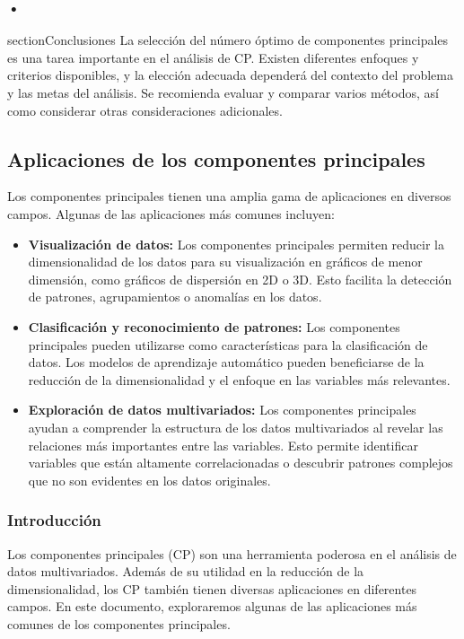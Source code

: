\documentclass{article}
\begin{document}
\subsubsection*{•}section{Conclusiones}
La selección del número óptimo de componentes principales es una tarea importante en el análisis de CP. Existen diferentes enfoques y criterios disponibles, y la elección adecuada dependerá del contexto del problema y las metas del análisis. Se recomienda evaluar y comparar varios métodos, así como considerar otras consideraciones adicionales. 


\subsection{Aplicaciones de los componentes principales}
Los componentes principales tienen una amplia gama de aplicaciones en diversos campos. Algunas de las aplicaciones más comunes incluyen:

\begin{itemize}
    \item \textbf{Visualización de datos:} Los componentes principales permiten reducir la dimensionalidad de los datos para su visualización en gráficos de menor dimensión, como gráficos de dispersión en 2D o 3D. Esto facilita la detección de patrones, agrupamientos o anomalías en los datos.
    \item \textbf{Clasificación y reconocimiento de patrones:} Los componentes principales pueden utilizarse como características para la clasificación de datos. Los modelos de aprendizaje automático pueden beneficiarse de la reducción de la dimensionalidad y el enfoque en las variables más relevantes.
    \item \textbf{Exploración de datos multivariados:} Los componentes principales ayudan a comprender la estructura de los datos multivariados al revelar las relaciones más importantes entre las variables. Esto permite identificar variables que están altamente correlacionadas o descubrir patrones complejos que no son evidentes en los datos originales.
\end{itemize}
\subsubsection{Introducción}
Los componentes principales (CP) son una herramienta poderosa en el análisis de datos multivariados. Además de su utilidad en la reducción de la dimensionalidad, los CP también tienen diversas aplicaciones en diferentes campos. En este documento, exploraremos algunas de las aplicaciones más comunes de los componentes principales.
\end{document}
